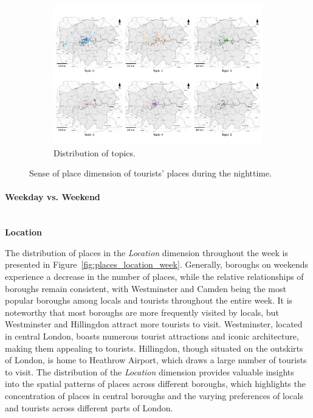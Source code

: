 \documentclass{article}
\newcommand{\subsubsubsection}[1]{\paragraph{#1}\mbox{}\\}
\theoremstyle{remark}
\begin{document}
\begin{figure}[!h]
    \begin{subfigure}{0.9\textwidth}
        \centering
        \includegraphics[width=\linewidth]{figures/topics_distribution_nighttime_tourists.png} 
        \caption{Distribution of topics.}
        \label{fig:topics_distribution_nighttime_tourists}
    \end{subfigure}

    \caption{Sense of place dimension of tourists' places during the nighttime.}
    \label{fig:places_topics_sense_tourists_nighttime}
\end{figure}

\subsubsubsection{Weekday vs. Weekend}

\textbf{Location}

The distribution of places in the \textit{Location} dimension throughout the week is presented in Figure~\ref{fig:places_location_week}. Generally, boroughs on weekends experience a decrease in the number of places, while the relative relationships of boroughs remain consistent, with Westminster and Camden being the most popular boroughs among locals and tourists throughout the entire week. It is noteworthy that most boroughs are more frequently visited by locals, but Westminster and Hillingdon attract more tourists to visit. Westminster, located in central London, boasts numerous tourist attractions and iconic architecture, making them appealing to tourists. Hillingdon, though situated on the outskirts of London, is home to Heathrow Airport, which draws a large number of tourists to visit. The distribution of the \textit{Location} dimension provides valuable insights into the spatial patterns of places across different boroughs, which highlights the concentration of places in central boroughs and the varying preferences of locals and tourists across different parts of London.
\end{document}
